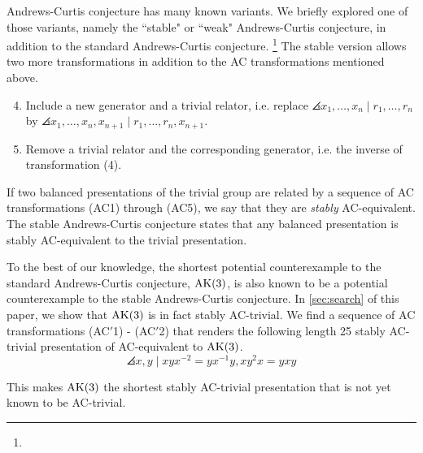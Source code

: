 Andrews-Curtis conjecture has many known variants. We briefly explored one of those variants, namely the ``stable" or ``weak" Andrews-Curtis conjecture, in addition to the standard Andrews-Curtis conjecture. 
\footnote{}
The stable version allows two more transformations in addition to the AC transformations mentioned above. 

\begin{enumerate}[label=(AC\arabic*)]
	\setcounter{enumi}{3}
	\item Include a new generator and a trivial relator, i.e. replace $\angles{x_1, \dots, x_n \mid r_1, \dots, r_n}$ by $\angles{x_1, \dots, x_n, x_{n+1} \mid r_1, \dots, r_n, x_{n+1}}$.
	\item Remove a trivial relator and the corresponding generator, i.e. the inverse of transformation (4). 
\end{enumerate}

If two balanced presentations of the trivial group are related by a sequence of AC transformations (AC1) through (AC5), we say that they are \textit{stably} AC-equivalent. The stable Andrews-Curtis conjecture states that any balanced presentation is stably AC-equivalent to the trivial presentation. 
\newline 

To the best of our knowledge, the shortest potential counterexample to the standard Andrews-Curtis conjecture, $\text{AK}(3)$, is also known to be a potential counterexample to the stable Andrews-Curtis conjecture. In \autoref{sec:search} of this paper, we show that $\text{AK}(3)$ is in fact stably AC-trivial. We find a sequence of AC transformations (AC$'$1) - (AC$'$2) that renders the following length 25 stably AC-trivial presentation of \cite{MMS} AC-equivalent to $\text{AK}(3)$.
\[
\angles{x, y \mid x y x^{-2} = y x^{-1} y, xy^2 x = y x y}
\]

This makes $\text{AK}(3)$ the shortest stably AC-trivial presentation that is not yet known to be AC-trivial.
 
